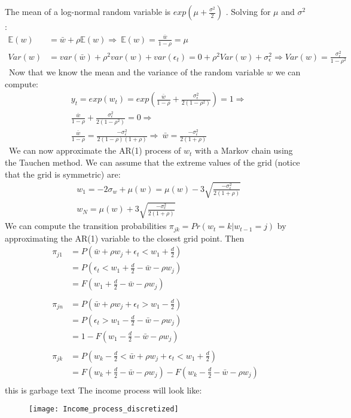 \documentclass[letter,11pt]{article}
\newcommand{\bE}{{\mathbb{E}}}
\begin{document}
The mean of a log-normal random variable is $exp(\mu + \frac{\sigma^2}{2})$ . Solving for $\mu$ and $\sigma^2$:
\begin{align*}
\bE(w) &= \bar{w} + \rho \bE(w)  \Rightarrow \ \boxed{\bE(w) = \frac{ \bar{w}}{1- \rho } = \mu} \\
Var(w) &= var(\bar{w}) + \rho^2 var(w) + var(\epsilon_t) = 0 +  \rho^2 Var(w) + \sigma_{\epsilon}^2  \Rightarrow \boxed{Var(w)  = \frac{ \sigma_{\epsilon}^2}{1-\rho^2}}
\end{align*} 
\
Now that we know the mean and the variance of the random variable $w$ we can compute:
\begin{align*}
& y_t = exp(w_t) = exp \left( \frac{ \bar{w}}{1- \rho } + \frac{ \sigma_{\epsilon}^2}{2(1-\rho^2)} \right) = 1 \Rightarrow \\
& \frac{ \bar{w}}{1- \rho } + \frac{ \sigma_{\epsilon}^2}{2(1-\rho^2)}  = 0 \Rightarrow \\
&\frac{ \bar{w}}{1- \rho } = \frac{- \sigma_{\epsilon}^2}{2(1-\rho)(1+\rho)}  \Rightarrow \ \boxed{\bar{w}  = \frac{- \sigma_{\epsilon}^2}{2 (1+\rho)}}
\end{align*}
\
We can now approximate the AR(1) process of $w_t$ with a Markov chain using the Tauchen method. We can assume that the extreme values of the grid (notice that the grid is symmetric) are:
\begin{align*}
& w_1 = -2 \sigma_w + \mu(w) = \mu(w) -3 \sqrt{\frac{- \sigma_{\epsilon}^2}{2 (1+\rho)}} \\
& w_N = \mu(w) + 3 \sqrt{\frac{- \sigma_{\epsilon}^2}{2 (1+\rho)}}
\end{align*}
We can compute the transition probabilities $\pi_{jk}=Pr(w_t = k | w_{t-1} = j)$ by approximating the AR(1) variable to the closest grid point. Then
\begin{align*}
\pi_{j1}	&= P \left( \bar{w} + \rho w_j + \epsilon_t < w_1 + \frac{d}{2} \right) \\
			&= P \left(\epsilon_t < w_1 + \frac{d}{2} - \bar{w} - \rho w_j   \right) \\
			&= F \left(  w_1 + \frac{d}{2} - \bar{w} - \rho w_j  \right) \\ \\
\pi_{jn}	&= P \left( \bar{w} + \rho w_j + \epsilon_t > w_1 - \frac{d}{2} \right) \\
			&= P \left(\epsilon_t > w_1 - \frac{d}{2} - \bar{w} - \rho w_j   \right) \\
			&= 1-F \left(  w_1 - \frac{d}{2} - \bar{w} - \rho w_j   \right) \\  \\
\pi_{jk} &= P \left( w_k - \frac{d}{2} < \bar{w} + \rho w_j + \epsilon_t < w_1 + \frac{d}{2} \right) \\
			&= F \left( w_k + \frac{d}{2} - \bar{w} - \rho w_j \right)  -  F \left( w_k - \frac{d}{2} - \bar{w} - \rho w_j \right)\\
\end{align*}
this is garbage text
The income process will look like:
\begin{figure}[h!]
  \centering
        \texttt{[image: Income\_process\_discretized]}
  \end{figure}
\end{document}
